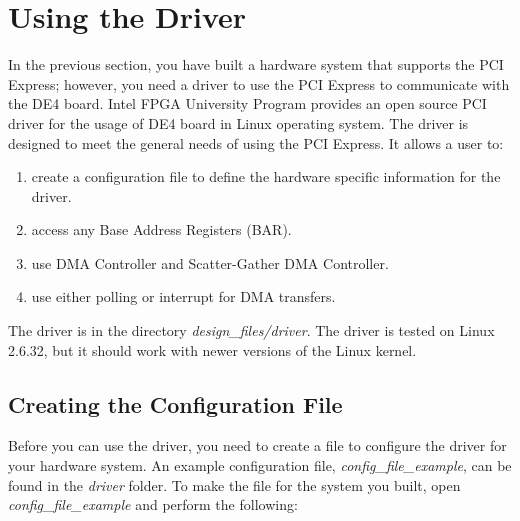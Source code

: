 \documentclass[11pt, twoside, pdftex]{article}
\begin{document}
\section{Using the Driver}
In the previous section, you have built a hardware system that supports the PCI Express; however, you need a driver to use the PCI Express to communicate with the DE4 board. Intel FPGA University Program provides an open source PCI driver for the usage of DE4 board in Linux operating system. The driver is designed to meet the general needs of using the PCI Express. It allows a user to:

\begin{enumerate}
	\item create a configuration file to define the hardware specific information for the driver.
	\item access any Base Address Registers (BAR). 
	\item use DMA Controller and Scatter-Gather DMA Controller.
	\item use either polling or interrupt for DMA transfers.
\end{enumerate}

The driver is in the directory {\it design\_files/driver}. The driver is tested on Linux 2.6.32, but it should work with newer versions of the Linux kernel. 

\subsection{Creating the Configuration File}
Before you can use the driver, you need to create a file to configure the driver for your hardware system. An example configuration file, {\it config\_file\_example}, can be found in the {\it driver} folder. To make the file for the system you built, open {\it config\_file\_example} and perform the following:
\end{document}
